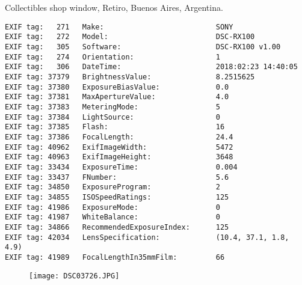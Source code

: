 \section{\protect{}}
\noindent Collectibles shop window, Retiro, Buenos Aires, Argentina.
\noindent
\begin{lstlisting}
EXIF tag:   271   Make:                          SONY
EXIF tag:   272   Model:                         DSC-RX100
EXIF tag:   305   Software:                      DSC-RX100 v1.00
EXIF tag:   274   Orientation:                   1
EXIF tag:   306   DateTime:                      2018:02:23 14:40:05
EXIF tag: 37379   BrightnessValue:               8.2515625
EXIF tag: 37380   ExposureBiasValue:             0.0
EXIF tag: 37381   MaxApertureValue:              4.0
EXIF tag: 37383   MeteringMode:                  5
EXIF tag: 37384   LightSource:                   0
EXIF tag: 37385   Flash:                         16
EXIF tag: 37386   FocalLength:                   24.4
EXIF tag: 40962   ExifImageWidth:                5472
EXIF tag: 40963   ExifImageHeight:               3648
EXIF tag: 33434   ExposureTime:                  0.004
EXIF tag: 33437   FNumber:                       5.6
EXIF tag: 34850   ExposureProgram:               2
EXIF tag: 34855   ISOSpeedRatings:               125
EXIF tag: 41986   ExposureMode:                  0
EXIF tag: 41987   WhiteBalance:                  0
EXIF tag: 34866   RecommendedExposureIndex:      125
EXIF tag: 42034   LensSpecification:             (10.4, 37.1, 1.8, 4.9)
EXIF tag: 41989   FocalLengthIn35mmFilm:         66

\end{lstlisting}
\clearpage
\begin{figure}
\raggedleft
\texttt{[image: DSC03726.JPG]}
\end{figure}


\clearpage
